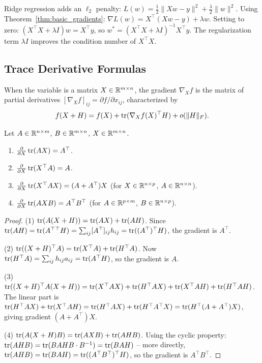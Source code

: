 \documentclass[11pt,a4paper]{article}
\begin{document}
\begin{example}
\label{ex:ridge}
Ridge regression adds an $\ell_2$ penalty:
$L(w) = \frac{1}{2}\|Xw - y\|^2 + \frac{\lambda}{2}\|w\|^2$.
Using Theorem~\ref{thm:basic_gradients}:
$\nabla L(w) = X^\top(Xw - y) + \lambda w$.
Setting to zero: $(X^\top X + \lambda I)w = X^\top y$,
so $w^* = (X^\top X + \lambda I)^{-1} X^\top y$.  The regularization
term $\lambda I$ improves the condition number of $X^\top X$.
\end{example}

\subsection{Trace Derivative Formulas}

When the variable is a matrix $X \in \mathbb{R}^{m \times n}$, the gradient
$\nabla_X f$ is the matrix of partial derivatives
$[\nabla_X f]_{ij} = \partial f / \partial x_{ij}$, characterized by
\[
  f(X + H) = f(X) + \operatorname{tr}(\nabla_X f(X)^\top H) + o(\|H\|_F).
\]

\begin{theorem}
\label{thm:trace_derivs}
Let $A \in \mathbb{R}^{n \times m}$, $B \in \mathbb{R}^{m \times n}$,
$X \in \mathbb{R}^{m \times n}$.
\begin{enumerate}[nosep]
  \item $\frac{\partial}{\partial X} \operatorname{tr}(AX) = A^\top$.
  \item $\frac{\partial}{\partial X} \operatorname{tr}(X^\top A) = A$.
  \item $\frac{\partial}{\partial X} \operatorname{tr}(X^\top A X)
        = (A + A^\top) X$ \quad (for $X \in \mathbb{R}^{n \times p}$,
        $A \in \mathbb{R}^{n \times n}$).
  \item $\frac{\partial}{\partial X} \operatorname{tr}(AXB) = A^\top B^\top$ \quad
        (for $A \in \mathbb{R}^{p \times m}$, $B \in \mathbb{R}^{n \times p}$).
\end{enumerate}
\end{theorem}

\begin{proof}
(1) $\operatorname{tr}(A(X+H)) = \operatorname{tr}(AX) + \operatorname{tr}(AH)$.  Since
$\operatorname{tr}(AH) = \operatorname{tr}(A^\top{}^\top H) = \sum_{ij} [A^\top]_{ij} h_{ij}
= \operatorname{tr}((A^\top)^\top H)$, the gradient is $A^\top$.

(2) $\operatorname{tr}((X+H)^\top A) = \operatorname{tr}(X^\top A) + \operatorname{tr}(H^\top A)$.
Now $\operatorname{tr}(H^\top A) = \sum_{ij} h_{ij} a_{ij} = \operatorname{tr}(A^\top H)$, so
the gradient is $A$.

(3) $\operatorname{tr}((X+H)^\top A(X+H)) = \operatorname{tr}(X^\top AX) + \operatorname{tr}(H^\top AX)
+ \operatorname{tr}(X^\top AH) + \operatorname{tr}(H^\top AH)$.  The linear part is
$\operatorname{tr}(H^\top AX) + \operatorname{tr}(X^\top AH)
= \operatorname{tr}(H^\top AX) + \operatorname{tr}(H^\top A^\top X)
= \operatorname{tr}(H^\top (A + A^\top)X)$, giving gradient $(A + A^\top)X$.

(4) $\operatorname{tr}(A(X+H)B) = \operatorname{tr}(AXB) + \operatorname{tr}(AHB)$.  Using the cyclic property:
$\operatorname{tr}(AHB) = \operatorname{tr}(BAHB \cdot B^{-1}) = \operatorname{tr}(BAH)$ -- more directly,
$\operatorname{tr}(AHB) = \operatorname{tr}(B A H) = \operatorname{tr}((A^\top B^\top)^\top H)$, so the gradient
is $A^\top B^\top$.
\end{proof}
\end{document}
